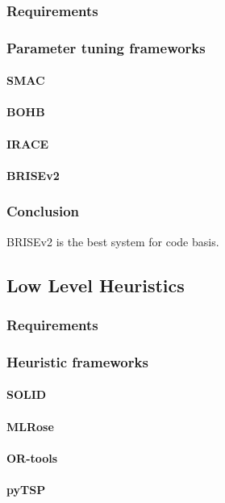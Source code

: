 \subsubsection{Requirements}
\subsubsection{Parameter tuning frameworks}
\paragraph{SMAC}
\paragraph{BOHB}
\paragraph{IRACE}
\paragraph{BRISEv2}
\subsubsection{Conclusion}
BRISEv2 is the best system for code basis.

\subsection{Low Level Heuristics}\label{concept:llh code basis selection}
\subsubsection{Requirements}
\subsubsection{Heuristic frameworks}
\paragraph{SOLID}
\paragraph{MLRose}
\paragraph{OR-tools}
\paragraph{pyTSP}
